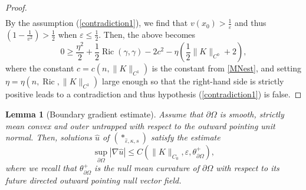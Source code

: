 \documentclass[11pt]{amsart}
\newtheorem{Lemma}[Theorem]{Lemma}
\renewcommand{\epsilon}{\varepsilon}
\DeclareMathOperator{\Ric}{Ric}    \DeclareMathOperator{\Rm}{Rm}
\def\e{\epsilon}
\def\l{\lambda}
\begin{document}
\begin{proof}
\[\begin{split}
\end{split}
\]
By the assumption (\ref{contradiction1}), we find that $v(x_0)>\frac{1}{\varepsilon}$ and thus $(1-\frac{1}{v^2})>\frac{1}{2}$ when $\varepsilon\leq\frac{1}{2}$. Then, the above becomes
\begin{equation*}
0\geq \frac{\eta^2}{2}+\frac{1}{2}\Ric(\gamma,\gamma)-2c^2-\eta\left(\frac12\|K\|_{C^0}+2\right),
\end{equation*}
where the constant $c=c(n, \|K\|_{C^1})$ is the constant from \eqref{MNest}, and setting $\eta=\eta(n,\Ric,\|K\|_{C^1})$ large enough so that the right-hand side is strictly positive leads to a contradiction and thus  hypothesis (\ref{contradiction1}) is false.
\end{proof}


\begin{Lemma}[Boundary gradient estimate]\label{boundaryforkappa}
Assume that  $\partial\Omega$ is smooth,  strictly mean convex and outer untrapped with respect to the outward pointing unit normal. 
Then, 
solutions $\hat{u}$ of $(*_{\hat{\varepsilon},\kappa,s})$ satisfy the estimate
\begin{equation*}
\sup_{\partial\Omega}|\nabla \hat{u}|\leq C(\|K\|_{C_0},\varepsilon,\theta^+_{\partial\Omega}),\end{equation*}
where we recall that $\theta^+_{\partial\Omega}$ is the null mean curvature of ${\partial\Omega}$ with respect to its future directed outward pointing null vector field.
\end{Lemma}
\end{document}
